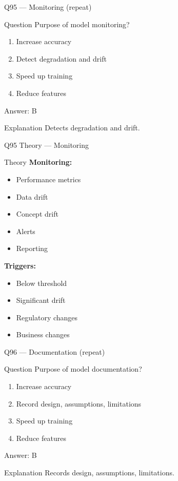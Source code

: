 \documentclass[aspectratio=169,8pt]{beamer}
\begin{document}
	\begin{frame}{Q95 --- Monitoring (repeat)}
		\begin{block}{Question}
			Purpose of model monitoring?
		\end{block}
		\begin{enumerate}[label=\Alph*.]
			\item Increase accuracy
			\item Detect degradation and drift
			\item Speed up training
			\item Reduce features
		\end{enumerate}
		\begin{exampleblock}{Answer: B}
		\end{exampleblock}
		\begin{block}{Explanation}
			Detects degradation and drift.
		\end{block}
	\end{frame}
	
	\begin{frame}{Q95 Theory --- Monitoring}
		\begin{block}{Theory}
			\textbf{Monitoring:}
			\begin{itemize}
				\item Performance metrics
				\item Data drift
				\item Concept drift
				\item Alerts
				\item Reporting
			\end{itemize}
			\textbf{Triggers:}
			\begin{itemize}
				\item Below threshold
				\item Significant drift
				\item Regulatory changes
				\item Business changes
			\end{itemize}
		\end{block}
	\end{frame}
	
	\begin{frame}{Q96 --- Documentation (repeat)}
		\begin{block}{Question}
			Purpose of model documentation?
		\end{block}
		\begin{enumerate}[label=\Alph*.]
			\item Increase accuracy
			\item Record design, assumptions, limitations
			\item Speed up training
			\item Reduce features
		\end{enumerate}
		\begin{exampleblock}{Answer: B}
		\end{exampleblock}
		\begin{block}{Explanation}
			Records design, assumptions, limitations.
		\end{block}
	\end{frame}
	
\end{document}
